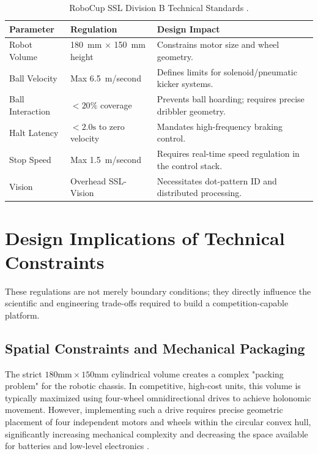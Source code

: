 \documentclass[a4paper,twoside,12pt]{report}
\begin{document}
\begin{table}[H]
    \centering
    \caption{RoboCup SSL Division B Technical Standards \citep{ssl_rules_2026}.}
    \label{tab:ssl_rules}
    \begin{tabularx}{\textwidth}{l l X}
        \toprule
        \textbf{Parameter} & \textbf{Regulation} & \textbf{Design Impact} \\
        \midrule
        Robot Volume & \SI{180}{\mm} $\times$ \SI{150}{\mm} height & Constrains motor size and wheel geometry. \\
        Ball Velocity & Max \SI{6.5}{\meter/second} & Defines limits for solenoid/pneumatic kicker systems. \\
        Ball Interaction & $< 20\%$ coverage & Prevents ball hoarding; requires precise dribbler geometry. \\
        Halt Latency & $< 2.0\text{s}$ to zero velocity & Mandates high-frequency braking control. \\
        Stop Speed & Max \SI{1.5}{\meter/second} & Requires real-time speed regulation in the control stack. \\
        Vision & Overhead SSL-Vision & Necessitates dot-pattern ID and distributed processing. \\
        \bottomrule
    \end{tabularx}
\end{table}

\section{Design Implications of Technical Constraints}

These regulations are not merely boundary conditions; they directly influence the scientific and engineering trade-offs required to build a competition-capable platform.

\subsection{Spatial Constraints and Mechanical Packaging}
The strict $180\text{mm} \times 150\text{mm}$ cylindrical volume creates a complex "packing problem" for the robotic chassis. In competitive, high-cost units, this volume is typically maximized using four-wheel omnidirectional drives to achieve holonomic movement. However, implementing such a drive requires precise geometric placement of four independent motors and wheels within the circular convex hull, significantly increasing mechanical complexity and decreasing the space available for batteries and low-level electronics \citep{ateam2023tdp}.
\end{document}
